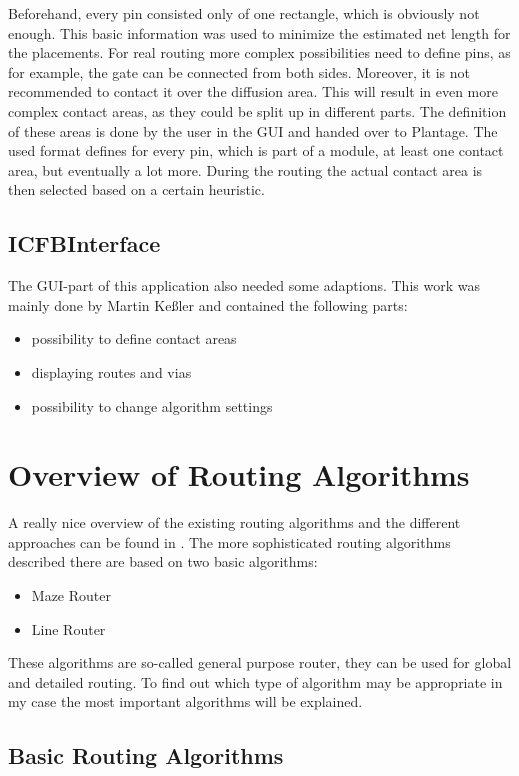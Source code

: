 Beforehand, every pin consisted only of one rectangle, which is obviously not enough. This basic information was used to minimize the estimated net length for the placements. For real routing more complex possibilities need to define pins, as for example, the gate can be connected from both sides. Moreover, it is not recommended to contact it over the diffusion area. This will result in even more complex contact areas, as they could be split up in different parts. The definition of these areas is done by the user in the GUI and handed over to Plantage. The used format defines for every pin, which is part of a module, at least one contact area, but eventually a lot more. During the routing the actual contact area is then selected based on a certain heuristic.

\subsection{ICFBInterface}
The GUI-part of this application also needed some adaptions. This work was mainly done by Martin Keßler and contained the following parts:

\begin{itemize}
\item possibility to define contact areas
\item displaying routes and vias
\item possibility to change algorithm settings
\end{itemize}	

\section{Overview of Routing Algorithms}
A really nice overview of the existing routing algorithms and the different approaches can be found in \cite[page 149 till 201]{springer:eda_analog_routing}. The more sophisticated routing algorithms described there are based on two basic algorithms:
\begin{itemize}
\item Maze Router
\item Line Router
\end{itemize}
These algorithms are so-called general purpose router, they can be used for global and detailed routing. To find out which type of algorithm may be appropriate in my case the most important algorithms will be explained.

\subsection{Basic Routing Algorithms}
